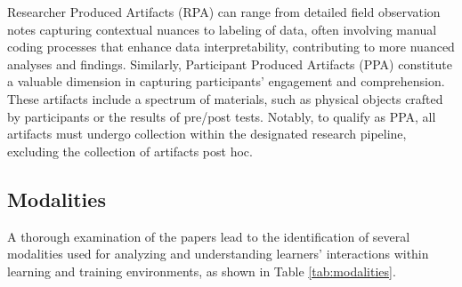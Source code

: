 \documentclass[manuscript,screen,review]{acmart}
\begin{document}
Researcher Produced Artifacts (RPA) can range from detailed field observation notes capturing contextual nuances to labeling of data, often involving manual coding processes that enhance data interpretability, contributing to more nuanced analyses and findings. Similarly, Participant Produced Artifacts (PPA) constitute a valuable dimension in capturing participants' engagement and comprehension. These artifacts include a spectrum of materials, such as physical objects crafted by participants or the results of pre/post tests. Notably, to qualify as PPA, all artifacts must undergo collection within the designated research pipeline, excluding the collection of artifacts post hoc. 

\subsection{Modalities} \label{sec:modalities}

A thorough examination of the papers lead to the identification of several modalities used for analyzing and understanding learners' interactions within learning and training environments, as shown in Table \ref{tab:modalities}. 
\end{document}
